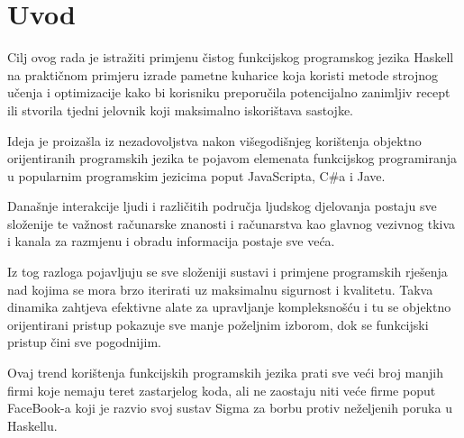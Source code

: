 \chapter{Uvod}

Cilj ovog rada je istražiti primjenu čistog funkcijskog programskog jezika Haskell na praktičnom primjeru izrade pametne kuharice koja koristi metode strojnog učenja i optimizacije kako bi korisniku preporučila potencijalno zanimljiv recept ili stvorila tjedni jelovnik koji maksimalno iskorištava sastojke.

Ideja je proizašla iz nezadovoljstva nakon višegodišnjeg korištenja objektno orijentiranih programskih jezika te pojavom elemenata funkcijskog programiranja u popularnim programskim jezicima poput JavaScripta, C\#a i Jave.

Današnje interakcije ljudi i različitih područja ljudskog djelovanja postaju sve složenije te važnost računarske znanosti i računarstva kao glavnog vezivnog tkiva i kanala za razmjenu i obradu informacija postaje sve veća.

Iz tog razloga pojavljuju se sve složeniji sustavi i primjene programskih rješenja nad kojima se mora brzo iterirati uz maksimalnu sigurnost i kvalitetu. Takva dinamika zahtjeva efektivne alate za upravljanje kompleksnošću i tu se objektno orijentirani pristup pokazuje sve manje poželjnim izborom, dok se funkcijski pristup čini sve pogodnijim.

Ovaj trend korištenja funkcijskih programskih jezika prati sve veći broj manjih firmi koje nemaju teret zastarjelog  koda, ali ne zaostaju niti veće firme poput FaceBook-a koji je razvio svoj sustav Sigma\cite{sigma} za borbu protiv neželjenih poruka  u Haskellu.